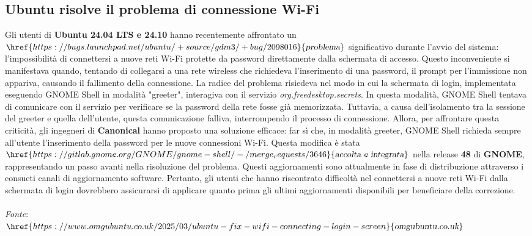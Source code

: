 \documentclass[a4paper,twoside]{article}
\begin{document}
\subsection{Ubuntu risolve il problema di connessione Wi-Fi}
Gli utenti di \textbf{Ubuntu 24.04 LTS e 24.10} hanno recentemente affrontato un $\href{https://bugs.launchpad.net/ubuntu/+source/gdm3/+bug/2098016}{\textsl{problema}}$ significativo durante l'avvio del sistema: l'impossibilità di connettersi a nuove reti Wi-Fi protette da password direttamente dalla schermata di accesso. Questo inconveniente si manifestava quando, tentando di collegarsi a una rete wireless che richiedeva l'inserimento di una password, il prompt per l'immissione non appariva, causando il fallimento della connessione. La radice del problema risiedeva nel modo in cui la schermata di login, implementata eseguendo GNOME Shell in modalità "greeter", interagiva con il servizio \textsl{org.freedesktop.secrets}. In questa modalità, GNOME Shell tentava di comunicare con il servizio per verificare se la password della rete fosse già memorizzata. Tuttavia, a causa dell'isolamento tra la sessione del greeter e quella dell'utente, questa comunicazione falliva, interrompendo il processo di connessione. Allora, per affrontare questa criticità, gli ingegneri di \textbf{Canonical} hanno proposto una soluzione efficace: far sì che, in modalità greeter, GNOME Shell richieda sempre all'utente l'inserimento della password per le nuove connessioni Wi-Fi. Questa modifica è stata $\href{https://gitlab.gnome.org/GNOME/gnome-shell/-/merge_requests/3646}{\textsl{accolta e integrata}}$ nella release \textbf{48} di \textbf{GNOME}, rappresentando un passo avanti nella risoluzione del problema. Questi aggiornamenti sono attualmente in fase di distribuzione attraverso i consueti canali di aggiornamento software. Pertanto, gli utenti che hanno riscontrato difficoltà nel connettersi a nuove reti Wi-Fi dalla schermata di login dovrebbero assicurarsi di applicare quanto prima gli ultimi aggiornamenti disponibili per beneficiare della correzione.\\
\\
\textit{Fonte}:\\
$\href{https://www.omgubuntu.co.uk/2025/03/ubuntu-fix-wifi-connecting-login-screen}{\textsl{omgubuntu.co.uk}}$
\end{document}
